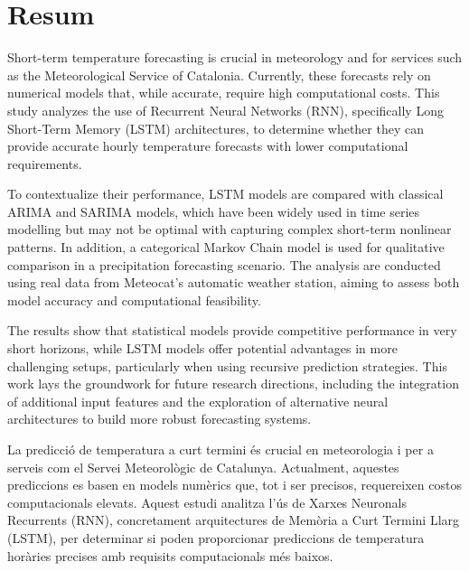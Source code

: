 \documentclass[../main.tex]{subfiles}
\begin{document}

\chapter*{Resum}\label{ch:resum}

Short-term temperature forecasting is crucial in meteorology and for services such as the Meteorological Service of Catalonia. Currently, these forecasts rely on numerical models that, while accurate, require high computational costs. This study analyzes the use of  Recurrent Neural Networks (RNN), specifically Long Short-Term Memory (LSTM) architectures, to determine whether they can provide accurate hourly temperature forecasts with lower computational requirements.

To contextualize their performance, LSTM models are compared with classical ARIMA and SARIMA models, which have been widely used in time series modelling  but may not be optimal with capturing complex short-term nonlinear patterns. In addition, a categorical Markov Chain model is used for qualitative comparison in a precipitation forecasting scenario. The analysis are conducted using real data from Meteocat's automatic weather station, aiming to assess both model accuracy and computational feasibility.

The results show that statistical models provide competitive performance in very short horizons, while LSTM models offer potential advantages in more challenging setups, particularly when using recursive prediction strategies. This work lays the groundwork for future research directions, including the integration of additional input features and the exploration of alternative neural architectures to build more robust forecasting systems.

\vspace{1cm}
\noindent\hrulefill
\vspace{1cm}

La predicció de temperatura a curt termini és crucial en meteorologia i per a serveis com el Servei Meteorològic de Catalunya. Actualment, aquestes prediccions es basen en models numèrics que, tot i ser precisos, requereixen costos computacionals elevats. Aquest estudi analitza l'ús de Xarxes Neuronals Recurrents (RNN), concretament arquitectures de Memòria a Curt Termini Llarg (LSTM), per determinar si poden proporcionar prediccions de temperatura horàries precises amb requisits computacionals més baixos.
\end{document}
